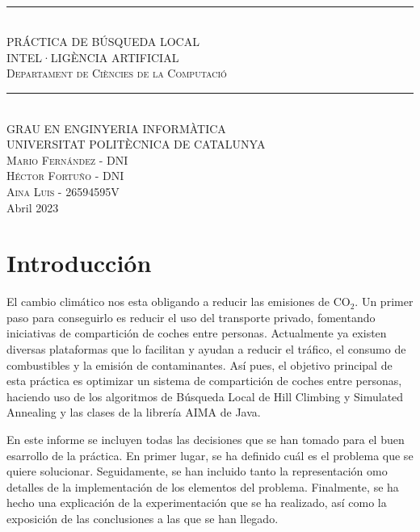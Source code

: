 \documentclass[10pt]{article}
\begin{document}
\begin{titlepage}

\newcommand{\HRule}{\rule{\linewidth}{0.5mm}}
\center
\textsc{ }\\[9cm]

\HRule \\[0.8cm]
{\LARGE PRÁCTICA DE BÚSQUEDA LOCAL}\\[1cm]
\textsc{INTEL·LIGÈNCIA ARTIFICIAL}\\
\textsc{Departament de Ciències de la Computació}\\[0.5cm]
\HRule \\[1cm]

\textsc{GRAU EN ENGINYERIA INFORMÀTICA}\\
\textsc{UNIVERSITAT POLITÈCNICA DE CATALUNYA}\\[9cm]

\vfill
\textsc{Mario Fernández - DNI} \\ [0.3cm]
\textsc{Héctor Fortuño - DNI}\\[0.3cm]
\textsc{Aina Luis - 26594595V}\\[0.3cm]
{\large Abril 2023}\\

\end{titlepage}

\pagestyle{empty}


\newpage
\tableofcontents
\newpage
\setcounter{page}{1}
\pagestyle{plain}
\section{Introducción}
El cambio climático nos esta obligando a reducir las emisiones de CO$_{2}$.
Un primer paso para conseguirlo es reducir el uso del transporte privado,
fomentando iniciativas de compartición de coches entre personas.
Actualmente ya existen diversas plataformas que lo facilitan y ayudan a
reducir el tráfico, el consumo de combustibles y la emisión de contaminantes.
Así pues, el objetivo principal de esta práctica es optimizar un sistema de
compartición de coches entre personas, haciendo uso de los algoritmos de
Búsqueda Local de Hill Climbing y Simulated Annealing y las clases de la
librería AIMA de Java.

En este informe se incluyen todas las decisiones que se han tomado para el buen
esarrollo de la práctica. En primer lugar, se ha definido cuál es el problema
que se quiere solucionar. Seguidamente, se han incluido tanto la representación
omo detalles de la implementación de los elementos del problema. Finalmente, se
ha hecho una explicación de la experimentación que se ha realizado, así como la
exposición de las conclusiones a las que se han llegado.
\end{document}
